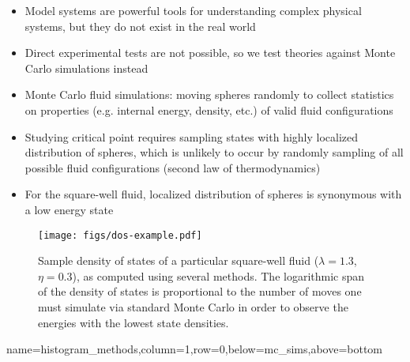 \documentclass[paperwidth=48in,paperheight=36in,
fontscale=0.27,margin=0.75in]{baposter}
\begin{document}
\begin{poster}
{    %


    \begin{itemize}
    \item Model systems are powerful tools for understanding complex
      physical systems, but they do not exist in the real world
    \item Direct experimental tests are not possible, so we test
      theories against Monte Carlo simulations instead
    \item Monte Carlo fluid simulations: moving spheres randomly to
      collect statistics on properties (e.g. internal energy, density,
      etc.) of valid fluid configurations
    \item Studying critical point requires sampling states with highly
      localized distribution of spheres, which is unlikely to occur by
      randomly sampling of all possible fluid configurations (second
      law of thermodynamics)
    \item For the square-well fluid, localized distribution of spheres
      is synonymous with a low energy state
    \end{itemize}

    \begin{figure}[H]
      \centering
      \texttt{[image: figs/dos-example.pdf]}
      \caption{Sample density of states of a particular square-well
        fluid ($\lambda=1.3$, $\eta=0.3$), as computed using several
        methods. The logarithmic span of the density of states is
        proportional to the number of moves one must simulate via
        standard Monte Carlo in order to observe the energies with the
        lowest state densities.}
      \label{fig:dos}
    \end{figure}

  }

  {name=histogram_methods,column=1,row=0,below=mc_sims,above=bottom} {%

}
\end{poster}
\end{document}
